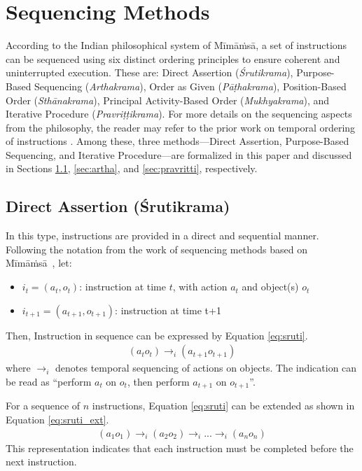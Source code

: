 \documentclass[a4paper,11pt]{lmcs}
\newcommand{\mimamsa}{M\={i}m\={a}\.ms\={a}}
\begin{document}
\section{Sequencing Methods}
\label{sec:seq}
According to the Indian philosophical system of \mimamsa, a set of instructions can be sequenced using six distinct ordering principles to ensure coherent and uninterrupted execution. These are: Direct Assertion (\textit{Śrutikrama}), Purpose-Based Sequencing (\textit{Arthakrama}), Order as Given (\textit{P\={a}\d{t}hakrama}), Position-Based Order (\textit{Sth\={a}nakrama}), Principal Activity-Based Order (\textit{Mukhyakrama}), and Iterative Procedure (\textit{Pravri\d{t}\d{t}ikrama}). For more details on the sequencing aspects from the philosophy, the reader may refer to the prior work on temporal ordering of instructions \cite{llm_mira}. Among these, three methods—Direct Assertion, Purpose-Based Sequencing, and Iterative Procedure—are formalized in this paper and discussed in Sections \ref{sec:sruti}, \ref{sec:artha}, and \ref{sec:pravritti}, respectively.


\subsection{Direct Assertion (\'{S}rutikrama)}
\label{sec:sruti}
In this type, instructions are provided in a direct and sequential manner. Following the notation from the work of sequencing methods based on \mimamsa~\cite{llm_mira}, let:
\begin{itemize}
 \item $i_t = (a_t,o_t)$: instruction at time $t$, with action $a_t$ and object(s) $o_t$
\item $i_{t+1} = (a_{t+1},o_{t+1})$: instruction at time t+1
 \end{itemize}
Then, Instruction in sequence can be expressed by Equation \ref{eq:sruti}.
\begin{eqnarray}
\label{eq:sruti}
 (a_t o_t) \rightarrow_i (a_{t+1}o_{t+1})
\end{eqnarray}
where $\rightarrow_i$ denotes temporal sequencing of actions on objects. The indication can be read as  ``perform $a_t$ on $o_t$, then perform $a_{t+1}$ on $o_{t+1}$''.

For a sequence of $n$ instructions, Equation \ref{eq:sruti} can be extended as shown in Equation \ref{eq:sruti_ext}.
\begin{eqnarray}
 \label{eq:sruti_ext}
 (a_1o_1) \rightarrow_i (a_2o_2) \rightarrow_i ... \rightarrow_i (a_no_n)
\end{eqnarray}
This representation indicates that each instruction must be completed before the next instruction.
\end{document}
